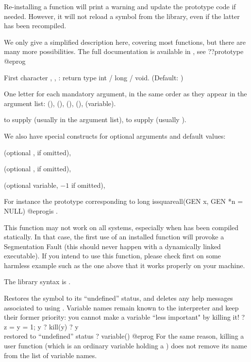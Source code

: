 Re-installing a function will print a warning and update the prototype code
if needed. However, it will not reload a symbol from the library, even if the
latter has been recompiled.

 We only give a simplified description here, covering
most functions, but there are many more possibilities. The full documentation
is available in , see
\bprog
  ??prototype
@eprog

\item First character , ,  : return type int / long /
void. (Default: )

\item One letter for each mandatory argument, in the same order as they appear
in the argument list:  (), \kbd{\&}
(),  (),  (), 
(variable).

 \item {} to supply  (usually  in the
 argument list),  to supply  (usually ).

 \noindent We also have special constructs for optional arguments and default
 values:

 \item {} (optional ,  if omitted),

 \item {} (optional ,  if omitted),

 \item {} (optional variable, $-1$ if omitted),

For instance the prototype corresponding to
\bprog
  long issquareall(GEN x, GEN *n = NULL)
@eprog\noindent is .

 This function may not work on all systems, especially
when  has been compiled statically. In that case, the first use of an
installed function will provoke a Segmentation Fault (this should never
happen with a dynamically linked executable). If you intend to use this
function, please check first on some harmless example such as the one above
that it works properly on your machine.

The library syntax is .

\label{se:kill}
Restores the symbol  to its ``undefined'' status, and deletes any
help messages associated to  using . Variable names
remain known to the interpreter and keep their former priority: you cannot
make a variable ``less important" by killing it!
\bprog
? z = y = 1; y
? kill(y)
? y            \\ restored to ``undefined'' status
? variable()
@eprog\noindent
For the same reason, killing a user function (which is an ordinary
variable holding a ) does not remove its name from the list of
variable names.


